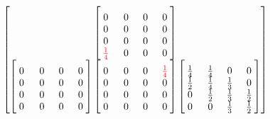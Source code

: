 {$$\begin{bmatrix}
\begin{bmatrix}
\phantom{aa}&\phantom{dd} & \phantom{cc} & \phantom{dd} \\[-1.5ex]
0 & 0 & 0 & 0 \\
0 & 0 & 0 & 0 \\
0 & 0 & 0 & 0 \\
\textcolor{red}{\frac{1}{4}} & 0 & 0 & 0 \\
\end{bmatrix}
\\
\begin{bmatrix}
\phantom{aa}&\phantom{dd} & \phantom{cc} & \phantom{dd} \\[-1.5ex]
0 & 0 & 0 & 0 \\
0 & 0 & 0 & 0 \\
0 & 0 & 0 & 0 \\
0 & 0 & 0 & 0 \\
\end{bmatrix}
\begin{bmatrix}
\phantom{aa}&\phantom{dd} & \phantom{cc} & \phantom{dd} \\[-1.5ex]
0 & 0 & 0 & \textcolor{red}{\frac{1}{4}} \\
0 & 0 & 0 & 0 \\
0 & 0 & 0 & 0 \\
0 & 0 & 0 & 0 \\
\end{bmatrix}
\begin{bmatrix}
\phantom{aa}&\phantom{dd} & \phantom{cc} & \phantom{dd} \\[-1.5ex]
\frac{1}{4} & \frac{1}{4} & 0 & 0 \\
\frac{1}{2} & \frac{1}{4} & \frac{1}{3} & 0  \\
0 & \frac{1}{2} & \frac{1}{3} & \frac{1}{2} \\
0 & 0 & \frac{1}{3} & \frac{1}{2}  \\
\end{bmatrix}
\end{bmatrix}
$$

}

